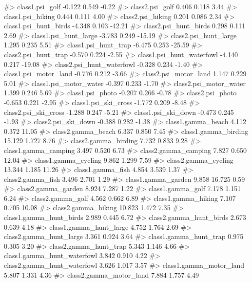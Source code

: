 \begin{example}
#> class1.psi_golf               -0.122   0.549  -0.22
#> class2.psi_golf                0.406   0.118   3.44
#> class1.psi_hiking              0.444   0.111   4.00
#> class2.psi_hiking              0.201   0.086   2.34
#> class1.psi_hunt_birds         -4.348   0.103 -42.21
#> class2.psi_hunt_birds          0.298   0.111   2.69
#> class1.psi_hunt_large         -3.783   0.249 -15.19
#> class2.psi_hunt_large          1.295   0.235   5.51
#> class1.psi_hunt_trap          -6.475   0.253 -25.59
#> class2.psi_hunt_trap          -0.570   0.224  -2.55
#> class1.psi_hunt_waterfowl     -4.140   0.217 -19.08
#> class2.psi_hunt_waterfowl     -0.328   0.234  -1.40
#> class1.psi_motor_land         -0.776   0.212  -3.66
#> class2.psi_motor_land          1.147   0.229   5.01
#> class1.psi_motor_water        -0.397   0.233  -1.70
#> class2.psi_motor_water         1.399   0.246   5.69
#> class1.psi_photo              -0.207   0.266  -0.78
#> class2.psi_photo              -0.653   0.221  -2.95
#> class1.psi_ski_cross          -1.772   0.209  -8.48
#> class2.psi_ski_cross          -1.288   0.247  -5.21
#> class1.psi_ski_down           -0.473   0.245  -1.93
#> class2.psi_ski_down           -0.388   0.282  -1.38
#> class1.gamma_beach             4.112   0.372  11.05
#> class2.gamma_beach             6.337   0.850   7.45
#> class1.gamma_birding          15.129   1.727   8.76
#> class2.gamma_birding           7.732   0.833   9.28
#> class1.gamma_camping           3.497   0.520   6.73
#> class2.gamma_camping           7.827   0.650  12.04
#> class1.gamma_cycling           9.862   1.299   7.59
#> class2.gamma_cycling          13.344   1.185  11.26
#> class1.gamma_fish              4.854   3.539   1.37
#> class2.gamma_fish              3.496   2.701   1.29
#> class1.gamma_garden            9.858  16.725   0.59
#> class2.gamma_garden            8.924   7.287   1.22
#> class1.gamma_golf              7.178   1.151   6.24
#> class2.gamma_golf              4.562   0.662   6.89
#> class1.gamma_hiking            7.107   0.705  10.08
#> class2.gamma_hiking           10.823   1.472   7.35
#> class1.gamma_hunt_birds        2.989   0.445   6.72
#> class2.gamma_hunt_birds        2.673   0.639   4.18
#> class1.gamma_hunt_large        4.752   1.764   2.69
#> class2.gamma_hunt_large        3.361   0.924   3.64
#> class1.gamma_hunt_trap         0.975   0.305   3.20
#> class2.gamma_hunt_trap         5.343   1.146   4.66
#> class1.gamma_hunt_waterfowl    3.842   0.910   4.22
#> class2.gamma_hunt_waterfowl    3.626   1.017   3.57
#> class1.gamma_motor_land        5.807   1.331   4.36
#> class2.gamma_motor_land        7.884   1.757   4.49

\end{example}

